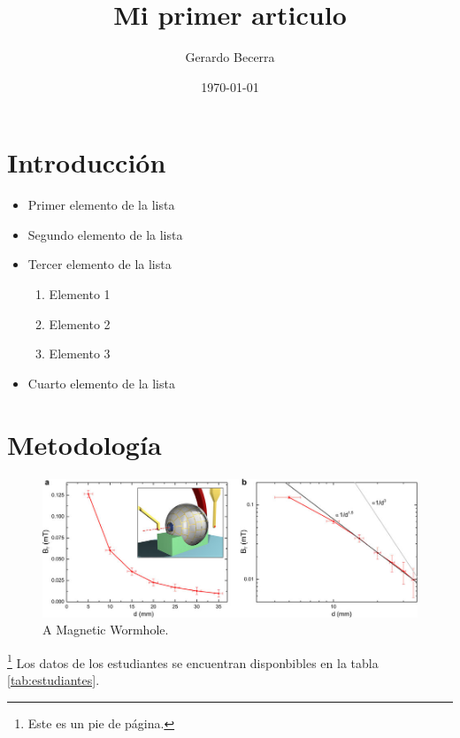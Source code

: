 \documentclass{article}
\title{Mi primer articulo}
\author{Gerardo Becerra}
\date{\today}
\begin{document}
  \maketitle

  \begin{abstract}
    \lipsum[1]
  \end{abstract}

  \section{Introducción}
  \lipsum[1-2] \cite{goodfellow2016deep}

  \begin{itemize}
    \item Primer elemento de la lista
    \item Segundo elemento de la lista
    \item Tercer elemento de la lista
    \begin{enumerate}
      \item Elemento 1
      \item Elemento 2
      \item Elemento 3
    \end{enumerate}
    \item Cuarto elemento de la lista
  \end{itemize}

  \lipsum[3-4]

  \section{Metodología}
  \lipsum[1] \cite{PIGA2021415}
  \begin{figure}
    \centering
    \includegraphics[width=\textwidth]{image.jpg}
    \caption{A Magnetic Wormhole.}
  \end{figure} 
  \lipsum[2]\footnote{Este es un pie de página.}
  Los datos de los estudiantes se encuentran disponbibles en la tabla \ref{tab:estudiantes}.
\end{document}
